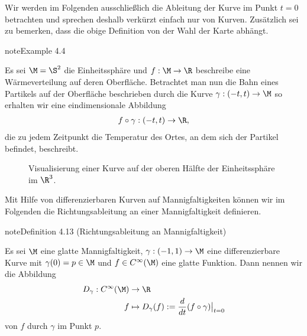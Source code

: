 \documentclass[letterpaper,10pt,german]{jupyterBook}
\let\sphinxpxdimen\pdfpxdimen\else\newdimen\sphinxpxdimen
\begin{document}
\sphinxAtStartPar
Wir werden im Folgenden ausschließlich die Ableitung der Kurve im Punkt \(t=0\) betrachten und sprechen deshalb verkürzt einfach nur von  Kurven.
Zusätzlich sei zu bemerken, dass die obige Definition  von der Wahl der Karte abhängt.
\label{manifolds/tangential:example-2}
\begin{sphinxadmonition}{note}{Example 4.4}



\sphinxAtStartPar
Es sei \(\M=\S^2\) die Einheitssphäre und \(f:\M\to\R\) beschreibe eine Wärmeverteilung auf deren Oberfläche.
Betrachtet man nun die Bahn eines Partikels auf der Oberfläche beschrieben durch die Kurve \(\gamma:(-t, t)\to \M\) so erhalten wir eine eindimensionale Abbildung
\begin{equation*}
\begin{split}f\circ\gamma:(-t,t)\to \R,\end{split}
\end{equation*}
\sphinxAtStartPar
die zu jedem Zeitpunkt die Temperatur des Ortes, an dem sich der Partikel befindet, beschreibt.
\end{sphinxadmonition}

\begin{figure}[htbp]
\centering
\capstart

\noindent\sphinxincludegraphics[width=350\sphinxpxdimen,height=300\sphinxpxdimen]{{velocity}.jpg}
\caption{Visualisierung einer Kurve auf der oberen Hälfte der Einheitssphäre im \(\R^3\).}\label{\detokenize{manifolds/tangential:fig-velocity}}\end{figure}

\sphinxAtStartPar
Mit Hilfe von differenzierbaren Kurven auf Mannigfaltigkeiten können wir im Folgenden die Richtungsableitung an einer Mannigfaltigkeit definieren.
\label{manifolds/tangential:def:direcdiv}
\begin{sphinxadmonition}{note}{Definition 4.13 (Richtungsableitung an Mannigfaltigkeit)}



\sphinxAtStartPar
Es sei \(\M\) eine glatte Mannigfaltigkeit, \(\gamma:(-1,1)\to\M\) eine differenzierbare Kurve mit \(\gamma(0)=p\in\M\) und \(f \in C^\infty(\M)\) eine glatte Funktion.
Dann nennen wir die Abbildung
\begin{equation*}
\begin{split}D_\gamma : C^\infty(\M) &\to \R\\
f &\mapsto D_\gamma(f):=\frac{d}{dt}(f\circ \gamma)\big\rvert_{t=0}\end{split}
\end{equation*}
\sphinxAtStartPar
{} von \(f\) durch \(\gamma\) im Punkt \(p\).
\end{sphinxadmonition}
\end{document}
